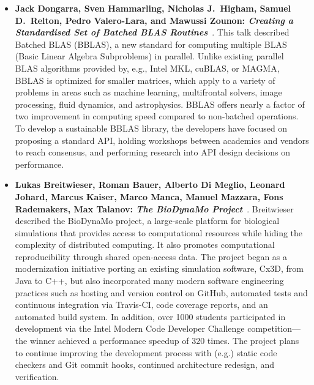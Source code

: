 \documentclass[11pt, oneside]{amsart}
\begin{document}
\begin{itemize}[itemsep=1ex]
    \item \textbf{Jack Dongarra, Sven Hammarling, Nicholas J.\ Higham, Samuel
    D.\ Relton\textsuperscript{\textasteriskcentered}, Pedro Valero-Lara,
    and Mawussi Zounon: \textit{Creating a Standardised Set of Batched
    BLAS Routines}}~\cite{Dongarra:2016ws}.
    This talk described Batched BLAS (BBLAS), a new standard for computing multiple
    BLAS (Basic Linear Algebra Subproblems) in parallel. Unlike existing parallel
    BLAS algorithms provided by, e.g., Intel MKL, cuBLAS, or MAGMA, BBLAS is
    optimized for smaller matrices, which apply to a variety of problems in areas
    such as machine learning, multifrontal solvers, image processing, fluid
    dynamics, and astrophysics. BBLAS offers nearly a factor of two improvement
    in computing speed compared to non-batched operations. To develop a sustainable
    BBLAS library, the developers have focused on proposing a standard API,
    holding workshops between academics and vendors to reach consensus, and
    performing research into API design decisions on performance.

    \item \textbf{Lukas Breitwieser\textsuperscript{\textasteriskcentered},
    Roman Bauer, Alberto Di Meglio, Leonard Johard,
    Marcus Kaiser, Marco Manca, Manuel Mazzara, Fons Rademakers,
    Max Talanov: \textit{The BioDynaMo Project}}~\cite{Bauer:2016ws}.
    Breitwieser described the BioDynaMo project, a large-scale platform for
    biological simulations that provides access to computational resources while
    hiding the complexity of distributed computing. It also promotes computational
    reproducibility through shared open-access data. The project began as a
    modernization initiative porting an existing simulation software, Cx3D, from
    Java to C++, but also incorporated many modern software engineering practices
    such as hosting and version control on GitHub, automated tests and continuous
    integration via Travis-CI, code coverage reports, and an automated build system.
    In addition, over 1000 students participated in development via the Intel
    Modern Code Developer Challenge competition---the winner achieved a
    performance speedup of 320 times. The project plans to continue improving
    the development process with (e.g.) static code checkers and Git commit hooks,
    continued architecture redesign, and verification.


\end{itemize}
\end{document}
